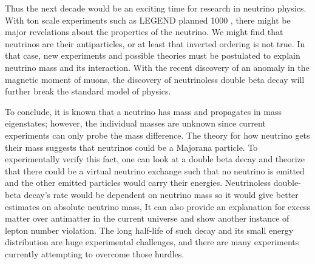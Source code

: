 Thus the next decade would be an exciting time for research in neutrino physics. With ton scale experiments such as LEGEND planned 1000 \cite{legend2017}, there might be major revelations about the properties of the neutrino. We might find that neutrinos are their antiparticles, or at least that inverted ordering is not true. In that case, new experiments and possible theories must be postulated to explain neutrino mass and its interaction. With the recent discovery of an anomaly in the magnetic moment of muons, the discovery of neutrinoless double beta decay will further break the standard model of physics.

To conclude, it is known that a neutrino has mass and propagates in mass eigenstates; however, the individual masses are unknown since current experiments can only probe the mass difference. The theory for how neutrino gets their mass suggests that neutrinos could be a Majorana particle. To experimentally verify this fact, one can look at a double beta decay and theorize that there could be a virtual neutrino exchange such that no neutrino is emitted and the other emitted particles would carry their energies. Neutrinoless double-beta decay's rate would be dependent on neutrino mass so it would give better estimates on absolute neutrino mass, It can also provide an explanation for excess matter over antimatter in the current universe and show another instance of lepton number violation. The long half-life of such decay and its small energy distribution are huge experimental challenges, and there are many experiments currently attempting to overcome those hurdles.

